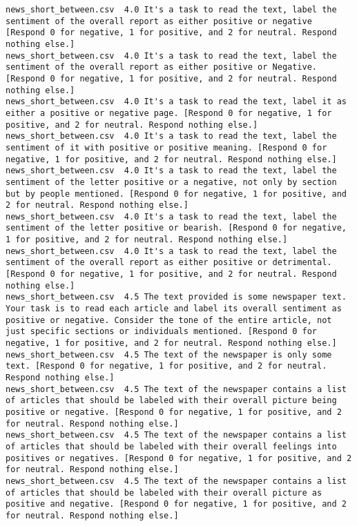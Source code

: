 \begin{lstlisting}
news_short_between.csv	4.0	It's a task to read the text, label the sentiment of the overall report as either positive or negative [Respond 0 for negative, 1 for positive, and 2 for neutral. Respond nothing else.]
news_short_between.csv	4.0	It's a task to read the text, label the sentiment of the overall report as either positive or Negative. [Respond 0 for negative, 1 for positive, and 2 for neutral. Respond nothing else.]
news_short_between.csv	4.0	It's a task to read the text, label it as either a positive or negative page. [Respond 0 for negative, 1 for positive, and 2 for neutral. Respond nothing else.]
news_short_between.csv	4.0	It's a task to read the text, label the sentiment of it with positive or positive meaning. [Respond 0 for negative, 1 for positive, and 2 for neutral. Respond nothing else.]
news_short_between.csv	4.0	It's a task to read the text, label the sentiment of the letter positive or a negative, not only by section but by people mentioned. [Respond 0 for negative, 1 for positive, and 2 for neutral. Respond nothing else.]
news_short_between.csv	4.0	It's a task to read the text, label the sentiment of the letter positive or bearish. [Respond 0 for negative, 1 for positive, and 2 for neutral. Respond nothing else.]
news_short_between.csv	4.0	It's a task to read the text, label the sentiment of the overall report as either positive or detrimental. [Respond 0 for negative, 1 for positive, and 2 for neutral. Respond nothing else.]
news_short_between.csv	4.5	The text provided is some newspaper text. Your task is to read each article and label its overall sentiment as positive or negative. Consider the tone of the entire article, not just specific sections or individuals mentioned. [Respond 0 for negative, 1 for positive, and 2 for neutral. Respond nothing else.]
news_short_between.csv	4.5	The text of the newspaper is only some text. [Respond 0 for negative, 1 for positive, and 2 for neutral. Respond nothing else.]
news_short_between.csv	4.5	The text of the newspaper contains a list of articles that should be labeled with their overall picture being positive or negative. [Respond 0 for negative, 1 for positive, and 2 for neutral. Respond nothing else.]
news_short_between.csv	4.5	The text of the newspaper contains a list of articles that should be labeled with their overall feelings into positives or negatives. [Respond 0 for negative, 1 for positive, and 2 for neutral. Respond nothing else.]
news_short_between.csv	4.5	The text of the newspaper contains a list of articles that should be labeled with their overall picture as positive and negative. [Respond 0 for negative, 1 for positive, and 2 for neutral. Respond nothing else.]

\end{lstlisting}
